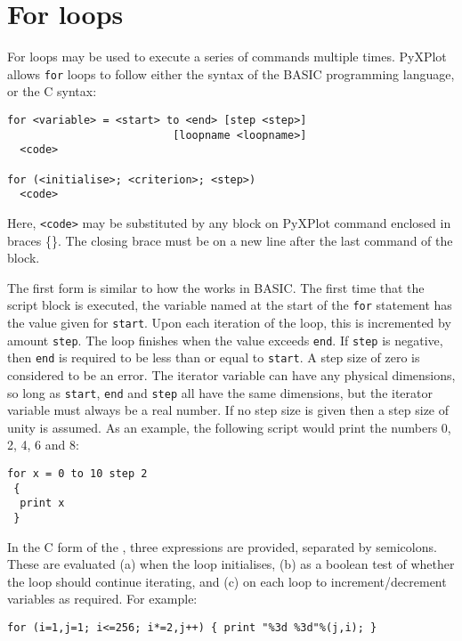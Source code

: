 \section{For loops}

For loops may be used to execute a series of commands multiple times. PyXPlot
allows {\tt for} loops to follow either the syntax of the BASIC programming
language, or the C syntax:

\begin{verbatim}
for <variable> = <start> to <end> [step <step>]
                          [loopname <loopname>]
  <code>

for (<initialise>; <criterion>; <step>)
  <code>
\end{verbatim}

\noindent Here, {\tt <code>} may be substituted by any block on PyXPlot command
enclosed in braces \{\}. The closing brace must be on a new line after the last
command of the block.

The first form is similar to how the  works in BASIC.  The first
time that the script block is executed, the variable named at the start of the
{\tt for} statement has the value given for {\tt start}.  Upon each iteration
of the loop, this is incremented by amount {\tt step}. The loop finishes when
the value exceeds {\tt end}. If {\tt step} is negative, then {\tt end} is
required to be less than or equal to {\tt start}. A step size of zero is
considered to be an error.  The iterator variable can have any physical
dimensions, so long as {\tt start}, {\tt end} and {\tt step} all have the same
dimensions, but the iterator variable must always be a real number. If no step
size is given then a step size of unity is assumed.  As an example, the
following script would print the numbers 0, 2, 4, 6 and 8:

\begin{verbatim}
for x = 0 to 10 step 2
 {
  print x
 }
\end{verbatim}

In the C form of the , three expressions are provided, separated
by semicolons. These are evaluated (a) when the loop initialises, (b) as a
boolean test of whether the loop should continue iterating, and (c) on each
loop to increment/decrement variables as required. For example:

\begin{verbatim}
for (i=1,j=1; i<=256; i*=2,j++) { print "%3d %3d"%(j,i); }
\end{verbatim}

